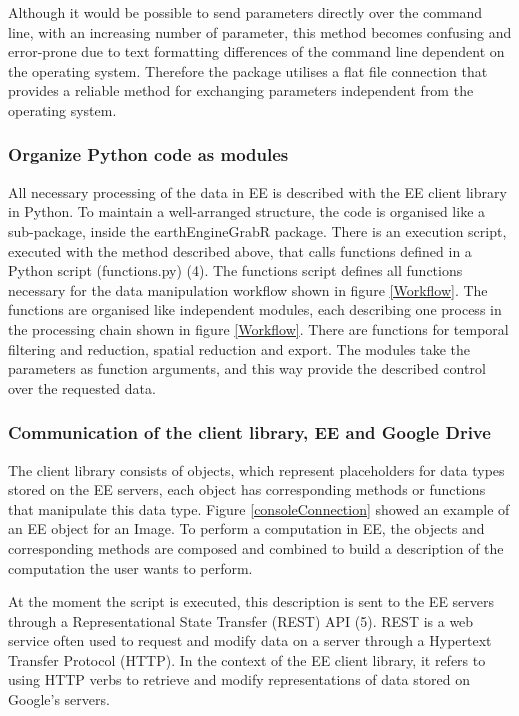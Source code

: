 Although it would be possible to send parameters directly over the command line, with an increasing number of parameter, this method becomes confusing and error-prone due to text formatting differences of the command line dependent on the operating system. Therefore the package utilises a flat file connection that provides a reliable method for exchanging parameters independent from the operating system.

\subsubsection{Organize Python code as modules}

All necessary processing of the data in EE is described with the EE client library in Python. To maintain a well-arranged structure, the code is organised like a sub-package, inside the earthEngineGrabR package. There is an execution script, executed with the method described above, that calls functions defined in a Python script (functions.py) (4). The functions script defines all functions necessary for the data manipulation workflow shown in figure \ref*{Workflow}. The functions are organised like independent modules, each describing one process in the processing chain shown in figure \ref*{Workflow}. There are functions for temporal filtering and reduction, spatial reduction and export. The modules take the parameters as function arguments, and this way provide the described control over the requested data.

\subsubsection{Communication of the client library, EE and Google Drive}

The client library consists of objects, which represent placeholders for data types stored on the EE servers, each object has corresponding methods or functions that manipulate this data type. Figure \ref{consoleConnection} showed an example of an EE object for an Image. To perform a computation in EE, the objects and corresponding methods are composed and combined to build a description of the computation the user wants to perform. 

At the moment the script is executed, this description is sent to the EE servers through a Representational State Transfer (REST) API (5). REST is a web service often used to request and modify data on a server through a Hypertext Transfer Protocol (HTTP).
In the context of the EE client library, it refers to using HTTP verbs to retrieve and modify representations of data stored on Google's servers.

